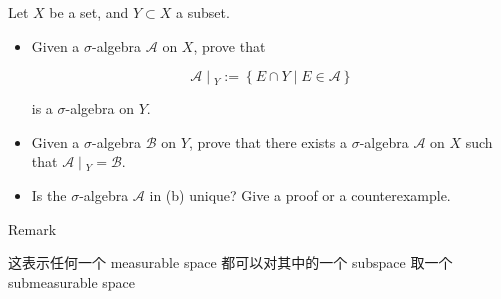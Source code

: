 Let \(X\) be a set, and \(Y \subset X\) a subset.

\begin{itemize}
\item
  Given a \(\sigma\)-algebra \(\mathcal{A}\) on \(X\), prove that

  \[\left. \mathcal{A} \middle| {}_{Y} := \left\{ {E \cap Y \mid E \in \mathcal{A}} \right\} \right.\]

  is a \(\sigma\)-algebra on \(Y\).
\item
  Given a \(\sigma\)-algebra \(\mathcal{B}\) on \(Y\), prove that there exists a \(\sigma\)-algebra \(\mathcal{A}\) on \(X\) such that \(\left. \mathcal{A} \middle| {}_{Y} = \mathcal{B} \right.\).
\item
  Is the \(\sigma\)-algebra \(\mathcal{A}\) in (b) unique? Give a proof or a counterexample.
\end{itemize}

\begin{qlremark}{Remark}

这表示任何一个 measurable space 都可以对其中的一个 subspace 取一个 submeasurable space

\end{qlremark}

